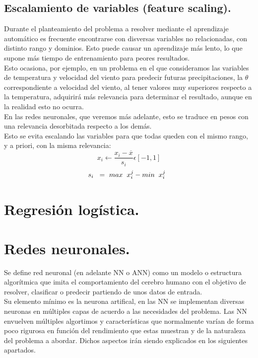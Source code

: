 \documentclass[a4paper,10pt]{article}
\begin{document}
\subsection{Escalamiento de variables (feature scaling).}
\noindent
Durante el planteamiento del problema a resolver mediante el aprendizaje automático es frecuente encontrarse con disversas variables no relacionadas, con distinto rango y dominios. Esto puede causar un aprendizaje más lento, lo que supone más tiempo de entrenamiento para peores resultados. \\
Esto ocasiona, por ejemplo, en un problema en el que consideramos las variables de temperatura y velocidad del viento para predecir futuras precipitaciones, la $\theta$ correspondiente a  velocidad del viento, al tener valores muy superiores respecto a la temperatura, adquirirá más relevancia para determinar el resultado, aunque en la realidad esto no ocurra.\\ En las redes neuronales, que veremos más adelante, esto se traduce en pesos con una relevancia desorbitada respecto a los demás.\\
Esto se evita escalando las variables para que todas queden con el mismo rango, y a priori, con la misma relevancia:
\[
x_i \longleftarrow \frac{x_i - \overline{x}}{s_i} \epsilon [-1,1]
\]
\hspace{0.20cm}
\[
s_i \hspace{0.20cm} = \  max\hspace{0.20cm}x_{i}^j -min\hspace{0.20cm}x_{i}^j \hspace{0.20cm}
\]
\newpage
\section{Regresión logística.}
\section{Redes neuronales.}

Se define red neuronal (en adelante NN o ANN) como un modelo o estructura algorítmica que imita el comportamiento del cerebro humano con el objetivo de resolver, clasificar o predecir partiendo de unos datos de entrada.\\
Su elemento mínimo es la neurona artifical, en las NN se implementan diversas neuronas en múltiples capas de acuerdo a las necesidades del problema.
Las NN envuelven múltiples algortimos y características que normalmente varían de forma poco rigurosa en función del rendimiento que estas muestran y de la naturaleza del problema a abordar. Dichos aspectos irán siendo explicados en los siguientes apartados.
\end{document}
